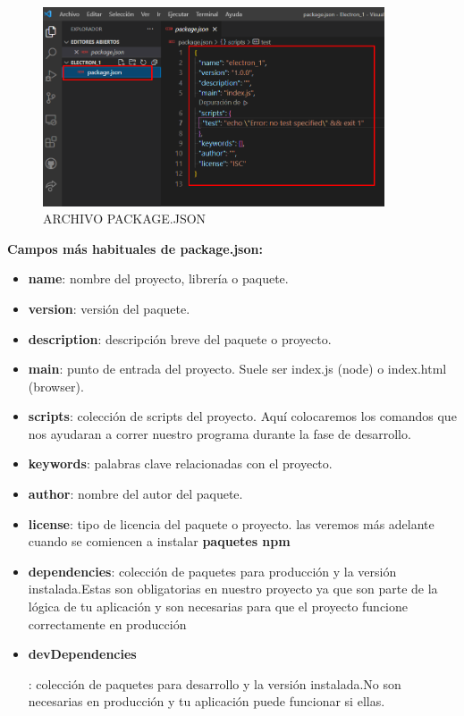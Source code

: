 \begin{enumerate}
\begin{figure}[H]
        \centering
        \includegraphics[width=0.9\textwidth]{img/electron5.png}
        \caption{ARCHIVO PACKAGE.JSON}
    \end{figure}
     \textbf{Campos más habituales de package.json:}
  \begin{itemize}
   \renewcommand{\labelitemi} {\textcolor{red}{$\bigstar$}}
      \item \textbf{name}: nombre del proyecto, librería o paquete.
      \item \textbf{version}: versión del paquete.
      \item \textbf{description}: descripción breve del paquete o proyecto.
      \item \textbf{main}: punto de entrada del proyecto. Suele ser index.js (node) o index.html (browser).
      \item \textbf{scripts}: colección de scripts del proyecto. Aquí colocaremos los comandos que nos ayudaran a correr nuestro programa durante la fase de desarrollo. 
      \item \textbf{keywords}: palabras clave relacionadas con el proyecto.
      \item \textbf{author}: nombre del autor del paquete.
      \item \textbf{license}: tipo de licencia del paquete o proyecto.
      las veremos más adelante cuando se comiencen a instalar \textbf{paquetes npm}
      
      \item \textbf{dependencies}: colección de paquetes para producción y la versión instalada.Estas son obligatorias en nuestro proyecto  ya que son parte de la lógica de tu aplicación y son necesarias para que el proyecto funcione correctamente en producción
      \item \hypertarget{thesentence}{\textbf{devDependencies}}: colección de paquetes para desarrollo y la versión instalada.No son necesarias en producción y tu aplicación puede funcionar si ellas.
  \end{itemize}
  

\end{enumerate}
